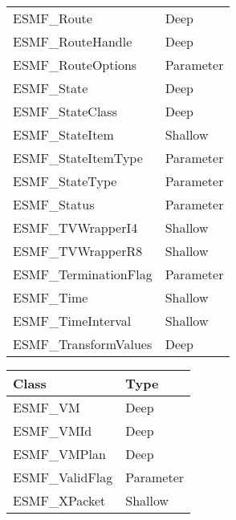 \begin{table}[t]
\begin{tabular}{ll}
ESMF\_Route                 & Deep \\
ESMF\_RouteHandle           & Deep \\
ESMF\_RouteOptions          & Parameter \\
ESMF\_State                 & Deep \\
ESMF\_StateClass            & Deep \\
ESMF\_StateItem             & Shallow\\
ESMF\_StateItemType         & Parameter \\
ESMF\_StateType             & Parameter \\
ESMF\_Status                & Parameter \\
ESMF\_TVWrapperI4           & Shallow\\
ESMF\_TVWrapperR8           & Shallow\\
ESMF\_TerminationFlag       & Parameter \\
ESMF\_Time                  & Shallow\\
ESMF\_TimeInterval          & Shallow\\
ESMF\_TransformValues       & Deep \\

\end{tabular}
\end{table}

\begin{table}[t]
\begin{tabular}{ll}

{\bf Class} &  {\bf Type} \\ \hline

ESMF\_VM                    & Deep \\
ESMF\_VMId                  & Deep \\
ESMF\_VMPlan                & Deep \\
ESMF\_ValidFlag             & Parameter \\
ESMF\_XPacket               & Shallow\\

\end{tabular}
\end{table}



















